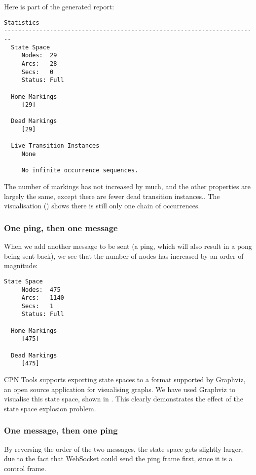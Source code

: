 	Here is part of the generated report:
	
	\begin{lstlisting}[language={}]
 Statistics
------------------------------------------------------------------------
  State Space
     Nodes:  29
     Arcs:   28
     Secs:   0
     Status: Full

  Home Markings
     [29]

  Dead Markings
     [29]

  Live Transition Instances
     None

     No infinite occurrence sequences.
	\end{lstlisting}
	
	The number of markings has not increased by much, and the other properties are
	largely the same, except there are fewer dead transition instances..
	The visualisation () shows there is still only one
	chain of occurrences.
	
	\subsubsection{One ping, then one message}
	When we add another message to be sent (a ping, which will also result in a
	pong being sent back), we see that the number of nodes has increased by an
	order of magnitude:
	
	\begin{lstlisting}[language={}]
  State Space
     Nodes:  475
     Arcs:   1140
     Secs:   1
     Status: Full
     
  Home Markings
     [475]

  Dead Markings
     [475]
	\end{lstlisting}

	CPN Tools supports exporting state spaces to a format supported by Graphviz, an
	open source application for visualising graphs. We have used Graphviz to
	visualise this state space, shown in . This
	clearly demonstrates the effect of the state space explosion problem.
	

	\subsubsection{One message, then one ping}
	By reversing the order of the two messages, the state space gets slightly
	larger, due to the fact that WebSocket could send the ping frame first, since
	it is a control frame.
	

